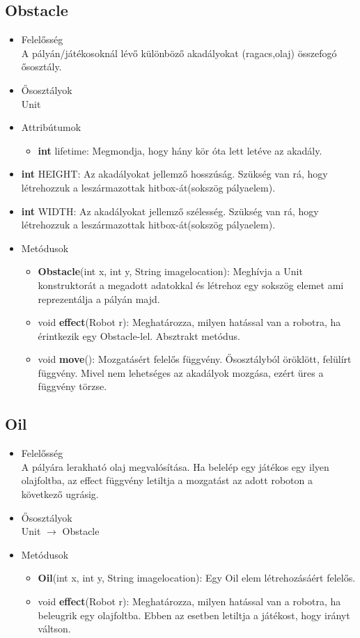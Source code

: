 \subsection{Obstacle}
\begin{itemize}
\item Felelősség\\
A pályán/játékosoknál lévő különböző akadályokat (ragacs,olaj) összefogó ősosztály.
\item Ősosztályok\\
Unit
\item Attribútumok
	\begin{itemize}
		\item \textbf{int} lifetime: Megmondja, hogy hány kör óta lett letéve az akadály.
	\end{itemize}
		\item \textbf{int} HEIGHT: Az akadályokat jellemző hosszúság. Szükség van rá, hogy létrehozzuk a leszármazottak hitbox-át(sokszög pályaelem).
		\item \textbf{int} WIDTH: Az akadályokat jellemző szélesség. Szükség van rá, hogy létrehozzuk a leszármazottak hitbox-át(sokszög pályaelem).
		
\item Metódusok
	\begin{itemize}
		\item \textbf{Obstacle}(int x, int y, String imagelocation): Meghívja a Unit konstruktorát a megadott adatokkal és létrehoz egy sokszög elemet ami reprezentálja a pályán majd.
		\item void \textbf{effect}(Robot r): Meghatározza, milyen hatással van a robotra, ha érintkezik egy Obstacle-lel. Absztrakt metódus.
		\item void \textbf{move}(): Mozgatásért felelős függvény. Ősosztályból öröklött, felülírt függvény. Mivel nem lehetséges az akadályok mozgása, ezért üres a függvény törzse.
	\end{itemize}
\end{itemize}

\subsection{Oil}
\begin{itemize}
\item Felelősség\\
A pályára lerakható olaj megvalósítása. Ha belelép egy játékos egy ilyen olajfoltba, az effect függvény letiltja a mozgatást az adott roboton a következő ugrásig.
\item Ősosztályok\\
Unit $\rightarrow$ Obstacle 
\item Metódusok
	\begin{itemize}
		\item \textbf{Oil}(int x, int y, String imagelocation): Egy Oil elem létrehozásáért felelős.
		\item void \textbf{effect}(Robot r): Meghatározza, milyen hatással van a robotra, ha beleugrik egy olajfoltba. Ebben az esetben letiltja a játékost, hogy irányt váltson.
	\end{itemize}
\end{itemize}

